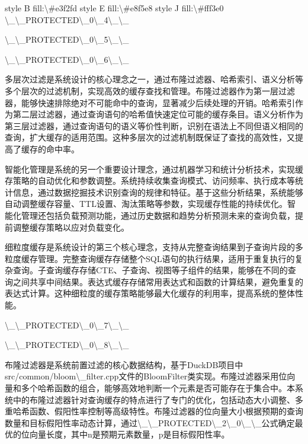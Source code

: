     style B fill:\textbackslash{}#e3f2fd
    style E fill:\textbackslash{}#e8f5e8
    style J fill:\textbackslash{}#fff3e0
\textbackslash{}_\textbackslash{}_PROTECTED\textbackslash{}_0\textbackslash{}_4\textbackslash{}_\textbackslash{}_

\textbackslash{}_\textbackslash{}_PROTECTED\textbackslash{}_0\textbackslash{}_5\textbackslash{}_\textbackslash{}_

\textbackslash{}_\textbackslash{}_PROTECTED\textbackslash{}_0\textbackslash{}_6\textbackslash{}_\textbackslash{}_

多层次过滤是系统设计的核心理念之一，通过布隆过滤器、哈希索引、语义分析等多个层次的过滤机制，实现高效的缓存查找和管理。布隆过滤器作为第一层过滤器，能够快速排除绝对不可能命中的查询，显著减少后续处理的开销。哈希索引作为第二层过滤器，通过查询语句的哈希值快速定位可能的缓存条目。语义分析作为第三层过滤器，通过查询语句的语义等价性判断，识别在语法上不同但语义相同的查询，扩大缓存的适用范围。这种多层次的过滤机制既保证了查找的高效性，又提高了缓存的命中率。

智能化管理是系统的另一个重要设计理念，通过机器学习和统计分析技术，实现缓存策略的自动优化和参数调整。系统持续收集查询模式、访问频率、执行成本等统计信息，通过数据挖掘技术识别查询的规律和特征。基于这些分析结果，系统能够自动调整缓存容量、TTL设置、淘汰策略等参数，实现缓存性能的持续优化。智能化管理还包括负载预测功能，通过历史数据和趋势分析预测未来的查询负载，提前调整缓存策略以应对负载变化。

细粒度缓存是系统设计的第三个核心理念，支持从完整查询结果到子查询片段的多粒度缓存管理。完整查询缓存存储整个SQL语句的执行结果，适用于重复执行的复杂查询。子查询缓存存储CTE、子查询、视图等子组件的结果，能够在不同的查询之间共享中间结果。表达式缓存存储常用表达式和函数的计算结果，避免重复的表达式计算。这种细粒度的缓存策略能够最大化缓存的利用率，提高系统的整体性能。

\textbackslash{}_\textbackslash{}_PROTECTED\textbackslash{}_0\textbackslash{}_7\textbackslash{}_\textbackslash{}_

\textbackslash{}_\textbackslash{}_PROTECTED\textbackslash{}_0\textbackslash{}_8\textbackslash{}_\textbackslash{}_

布隆过滤器是系统前置过滤的核心数据结构，基于DuckDB项目中src/common/bloom\textbackslash{}_filter.cpp文件的BloomFilter类实现。布隆过滤器采用位向量和多个哈希函数的组合，能够高效地判断一个元素是否可能存在于集合中。本系统中的布隆过滤器针对查询缓存的特点进行了专门的优化，包括动态大小调整、多重哈希函数、假阳性率控制等高级特性。布隆过滤器的位向量大小根据预期的查询数量和目标假阳性率动态计算，通过\textbackslash{}_\textbackslash{}_PROTECTED\textbackslash{}_2\textbackslash{}_0\textbackslash{}_\textbackslash{}_公式确定最优的位向量长度，其中n是预期元素数量，p是目标假阳性率。

